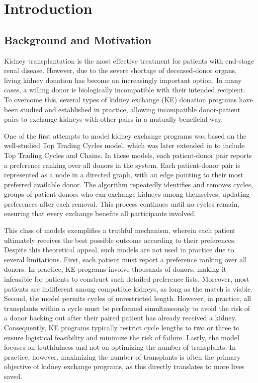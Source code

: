 \chapter{Introduction}
\label{cha:introduction}


\section{Background and Motivation}
\label{sec:background_and_motivation}

Kidney transplantation is the most effective treatment for patients with end-stage renal disease. However, due to the severe shortage of deceased-donor organs, living kidney donation has become an increasingly important option. In many cases, a willing donor is biologically incompatible with their intended recipient. To overcome this, several types of kidney exchange (KE) donation programs have been studied and established in practice, allowing incompatible donor-patient pairs to exchange kidneys with other pairs in a mutually beneficial way.

One of the first attempts to model kidney exchange programs was based on the well-studied Top Trading Cycles model, which was later extended in \cite{roth2004kidney} to include Top Trading Cycles and Chains. In these models, each patient-donor pair reports a preference ranking over all donors in the system. Each patient-donor pair is represented as a node in a directed graph, with an edge pointing to their most preferred available donor. The algorithm repeatedly identifies and removes cycles, groups of patient-donors who can exchange kidneys among themselves, updating preferences after each removal. This process continues until no cycles remain, ensuring that every exchange benefits all participants involved.

This class of models exemplifies a truthful mechanism, wherein each patient ultimately receives the best possible outcome according to their preferences. Despite this theoretical appeal, such models are not used in practice due to several limitations. First, each patient must report a preference ranking over all donors. In practice, KE programs involve thousands of donors, making it infeasible for patients to construct such detailed preference lists. Moreover, most patients are indifferent among compatible kidneys, as long as the match is viable. Second, the model permits cycles of unrestricted length. However, in practice, all transplants within a cycle must be performed simultaneously to avoid the risk of a donor backing out after their paired patient has already received a kidney. Consequently, KE programs typically restrict cycle lengths to two or three to ensure logistical feasibility and minimize the risk of failure. Lastly, the model focuses on truthfulness and not on optimizing the number of transplants. In practice, however, maximizing the number of transplants is often the primary objective of kidney exchange programs, as this directly translates to more lives saved.

